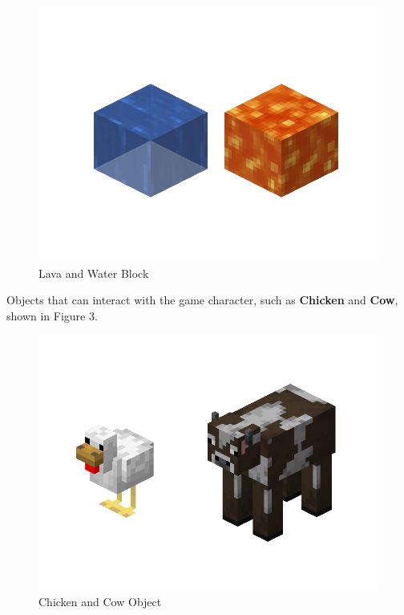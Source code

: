 \documentclass[12pt, titlepage]{article}
\newcounter{acnum}
\newcommand{\actheacnum}{AC\theacnum}
\begin{document}
\begin{description}
\begin{figure}[hbt!]
\centering
\includegraphics[scale=0.25]{block}
\caption{Lava and Water Block}
\end{figure}
\FloatBarrier

\item [\refstepcounter{acnum} \actheacnum \label{acobject}:] Objects that can interact with the game character, such as \textbf{Chicken} and \textbf{Cow}, shown in Figure 3.\\\FloatBarrier
\begin{figure}[hbt!]
\centering
\includegraphics[scale=0.25]{object}
\caption{Chicken and Cow Object}
\end{figure}
\FloatBarrier


\end{description}
\end{document}

